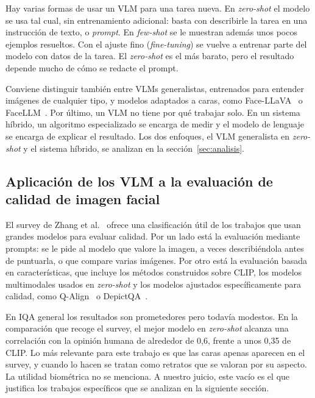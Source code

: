 Hay varias formas de usar un VLM para una tarea nueva. En \textit{zero-shot} el modelo se usa tal cual, sin entrenamiento adicional: basta con describirle la tarea en una instrucción de texto, o \textit{prompt}. En \textit{few-shot} se le muestran además unos pocos ejemplos resueltos. Con el ajuste fino (\textit{fine-tuning}) se vuelve a entrenar parte del modelo con datos de la tarea. El \textit{zero-shot} es el más barato, pero el resultado depende mucho de cómo se redacte el prompt.

Conviene distinguir también entre VLMs generalistas, entrenados para entender imágenes de cualquier tipo, y modelos adaptados a caras, como Face-LLaVA~\cite{Chaubey_2026_WACV} o FaceLLM~\cite{Shahreza_2025_ICCVW}. Por último, un VLM no tiene por qué trabajar solo. En un sistema híbrido, un algoritmo especializado se encarga de medir y el modelo de lenguaje se encarga de explicar el resultado. Los dos enfoques, el VLM generalista en \textit{zero-shot} y el sistema híbrido, se analizan en la sección~\ref{sec:analisis}.

\subsection{Aplicación de los VLM a la evaluación de calidad de imagen facial}
\label{sec:vlm-calidad}
El survey de Zhang et al.~\cite{Zhang_2025_TOMM} ofrece una clasificación útil de los trabajos que usan grandes modelos para evaluar calidad. Por un lado está la evaluación mediante prompts: se le pide al modelo que valore la imagen, a veces describiéndola antes de puntuarla, o que compare varias imágenes. Por otro está la evaluación basada en características, que incluye los métodos construidos sobre CLIP, los modelos multimodales usados en \textit{zero-shot} y los modelos ajustados específicamente para calidad, como Q-Align~\cite{Wu_2024_ICML} o DepictQA~\cite{You_2024_ECCV}.

En IQA general los resultados son prometedores pero todavía modestos. En la comparación que recoge el survey, el mejor modelo en \textit{zero-shot} alcanza una correlación con la opinión humana de alrededor de 0,6, frente a unos 0,35 de CLIP. Lo más relevante para este trabajo es que las caras apenas aparecen en el survey, y cuando lo hacen se tratan como retratos que se valoran por su aspecto. La utilidad biométrica no se menciona. A nuestro juicio, este vacío es el que justifica los trabajos específicos que se analizan en la siguiente sección.
